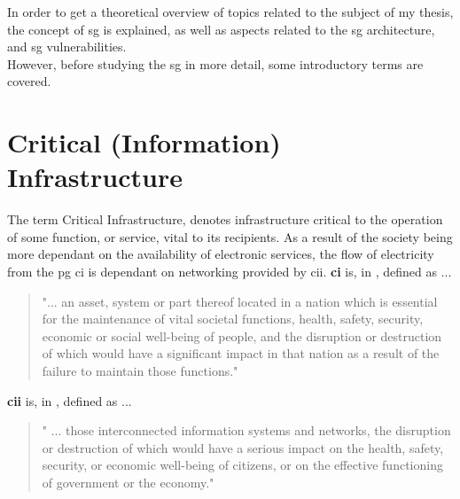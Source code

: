 
 
In order to get a theoretical overview of topics related to the subject of my thesis, the concept of \acrfull{sg} is explained, as well as aspects related to the \acrshort{sg} architecture, and \acrshort{sg} vulnerabilities.\\  

However, before studying the \acrshort{sg} in more detail,  some introductory terms are covered.  



\section{Critical (Information) Infrastructure}

The term Critical Infrastructure, denotes infrastructure critical to the operation of some function, or service, vital to its recipients. As a result of the society being more dependant on the availability of electronic services, the flow of electricity from the \acrshort{pg} \acrfull{ci} is dependant on networking provided by \acrfull{cii}.
\textbf{\acrfull{ci}} is, in  \cite{luiijf2012understanding}, defined as ... 
 \begin{quote}
"... an asset, system or part thereof located in a
nation which is essential for the maintenance of vital societal functions, health, safety,
security, economic or social well-being of people, and the disruption or destruction of
which would have a significant impact in that nation as a result of the failure to maintain
those functions." \cite[p. 53]{luiijf2012understanding}     
 \end{quote}
 

\textbf{\acrfull{cii}} is, in  \cite{luiijf2012understanding}, defined as ...
 \begin{quote}
" ... those interconnected information
systems and networks, the disruption or destruction of which would have a
serious impact on the health, safety, security, or economic well-being of citizens, or
on the effective functioning of government or the economy." \cite[p. 53]{luiijf2012understanding}     
 \end{quote}



